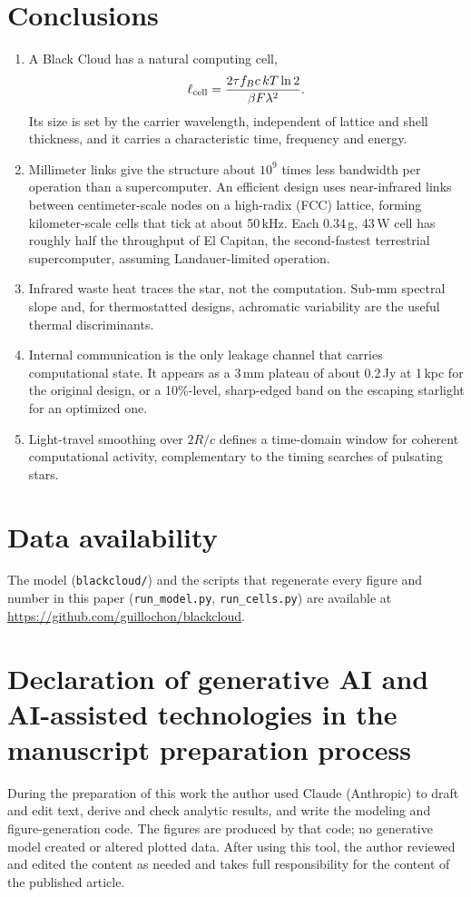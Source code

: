 \documentclass[final,5p]{elsarticle}
\newcommand{\kTl}{kT\ln 2}
\newcommand{\lcell}{\ell_{\rm cell}}
\begin{document}
\section{Conclusions}
\begin{enumerate}
\item A Black Cloud has a natural computing cell,
\[
\lcell=\frac{2\tau f_B c\,\kTl}{\beta F\lambda^2}.
\]
Its size is set by the carrier wavelength, independent of lattice and shell thickness, and it carries a characteristic time, frequency and energy.
\item Millimeter links give the structure about $10^{9}$ times less bandwidth per operation than a supercomputer. An efficient design uses near-infrared links between centimeter-scale nodes on a high-radix (FCC) lattice, forming kilometer-scale cells that tick at about 50\,kHz. Each 0.34\,g, 43\,W cell has roughly half the throughput of El Capitan, the second-fastest terrestrial supercomputer, assuming Landauer-limited operation.
\item Infrared waste heat traces the star, not the computation. Sub-mm spectral slope and, for thermostatted designs, achromatic variability are the useful thermal discriminants.
\item Internal communication is the only leakage channel that carries computational state. It appears as a 3\,mm plateau of about 0.2\,Jy at 1\,kpc for the original design, or a 10\%-level, sharp-edged band on the escaping starlight for an optimized one.
\item Light-travel smoothing over $2R/c$ defines a time-domain window for coherent computational activity, complementary to the timing searches of pulsating stars.
\end{enumerate}

\section*{Data availability}
The model (\texttt{blackcloud/}) and the scripts that regenerate every figure and number in this paper (\texttt{run\_model.py}, \texttt{run\_cells.py}) are available at \url{https://github.com/guillochon/blackcloud}.

\section*{Declaration of generative AI and AI-assisted technologies in the manuscript preparation process}
During the preparation of this work the author used Claude (Anthropic) to draft and edit text, derive and check analytic results, and write the modeling and figure-generation code. The figures are produced by that code; no generative model created or altered plotted data. After using this tool, the author reviewed and edited the content as needed and takes full responsibility for the content of the published article.
\end{document}

